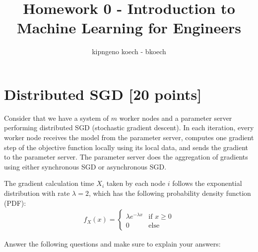 \documentclass[a3paper,12pt]{extarticle} %
\begin{document}
\author{kipngeno koech - bkoech}
\title{Homework 0 - Introduction to Machine Learning for Engineers}   
\maketitle

\medskip

\maketitle

\section{Distributed SGD [20 points]}
Consider that we have a system of $m$ worker nodes and a parameter server performing distributed SGD (stochastic gradient descent). In each iteration, every worker node receives the model from the parameter server, computes one gradient step of the objective function locally using its local data, and sends the gradient to the parameter server. The parameter server does the aggregation of gradients using either synchronous SGD or asynchronous SGD.

The gradient calculation time $X_i$ taken by each node $i$ follows the exponential distribution with rate $\lambda = 2$, which has the following probability density function (PDF):
\begin{align}
f_X(x) = 
\begin{cases}
\lambda e^{-\lambda x} & \text{if } x \geq 0\\
0 & \text{else}
\end{cases}
\end{align}

Answer the following questions and make sure to explain your answers:
\end{document}
